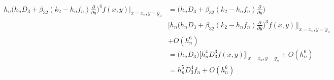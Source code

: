\documentclass[12 pt]{article}
\begin{document}
\begin{align*}
	h_{n}\bigg(h_{n}D_{3}+\beta_{32}(k_{2}-h_{n}f_{n})\frac{\partial}{\partial y}\bigg)^{4}f(x,y)\bigg\vert_{x = x_{n}, y= y_{n}} &= \bigg(h_{n}D_{3}+\beta_{32}(k_{2}-h_{n}f_{n})\frac{\partial}{\partial y}\bigg)\\
					 &\bigg[h_{n}\bigg(h_{n}D_{3}+\beta_{32}(k_{2}-h_{n}f_{n})\frac{\partial}{\partial y}\bigg)^{3}f(x,y)\bigg]\bigg\vert_{x = x_{n}, y= y_{n}} \\
	                 &+ O(h_{n}^{6})\\
					 &=\bigg(h_{n}D_{3}\bigg)\bigg[h_{n}^{4}D_{3}^{3}f(x,y)\bigg]\bigg\vert_{x = x_{n}, y= y_{n}} + O(h_{n}^{6})\\
					 &= h_{n}^{5}D_{3}^{4}f_{n} + O(h_{n}^{6})
\end{align*}
\end{document}
